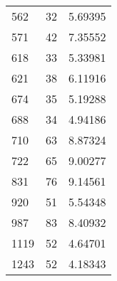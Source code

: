 \begin{longtable}[c]{|l|l|l|}
562    & 32       & 5.69395       \\
571    & 42       & 7.35552       \\
618    & 33       & 5.33981       \\
621    & 38       & 6.11916       \\
674    & 35       & 5.19288       \\
688    & 34       & 4.94186       \\
710    & 63       & 8.87324       \\
722    & 65       & 9.00277       \\
831    & 76       & 9.14561       \\
920    & 51       & 5.54348       \\
987    & 83       & 8.40932       \\
1119   & 52       & 4.64701       \\
1243   & 52       & 4.18343       \\
\hline
\end{longtable}